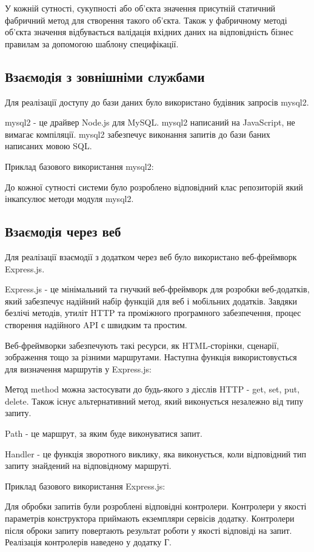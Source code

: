 У кожній сутності, сукупності або об'єкта значення присутній статичний фабричний метод для створення такого об'єкта.
Також у фабричному методі об'єкта значення відбувається валідація вхідних даних на відповідність бізнес
правилам за допомогою шаблону специфікації.

\subsection{Взаємодія з зовнішніми службами}

Для реалізації доступу до бази даних було використано будівник запросів mysql2.

mysql2 - це драйвер Node.js для MySQL. mysql2 написаний на JavaScript, не вимагає компіляції.
mysql2 забезпечує виконання запитів до бази баних написаних мовою SQL.

Приклад базового використання mysql2:


До кожної сутності системи було розроблено відповідний клас репозиторій
який інкапсулює методи модуля mysql2.

\subsection{Взаємодія через веб}

Для реалізації взаємодії з додатком через веб було використано веб-фреймворк Express.js.

Express.js - це мінімальний та гнучкий веб-фреймворк для розробки веб-додатків,
який забезпечує надійний набір функцій для веб і мобільних додатків.
Завдяки безлічі методів, утиліт HTTP та проміжного програмного
забезпечення, процес створення надійного API є швидким та простим.

Веб-фреймворки забезпечують такі ресурси, як HTML-сторінки, сценарії,
зображення тощо за різними маршрутами.
Наступна функція використовується для визначення маршрутів у Express.js:


Метод method можна застосувати до будь-якого з дієслів HTTP - get, set, put, delete.
Також існує альтернативний метод, який виконується незалежно від типу запиту.

Path - це маршрут, за яким буде виконуватися запит.

Handler - це функція зворотного виклику, яка виконується,
коли відповідний тип запиту знайдений на відповідному маршруті.

Приклад базового використання Express.js:


Для обробки запитів були розроблені відповідні контролери. Контролери
у якості параметрів конструктора приймають екземпляри сервісів додатку.
Контролери після оброки запиту повертають результат роботи у якості відповіді на запит.
Реалізація контролерів наведено у додатку Г.
